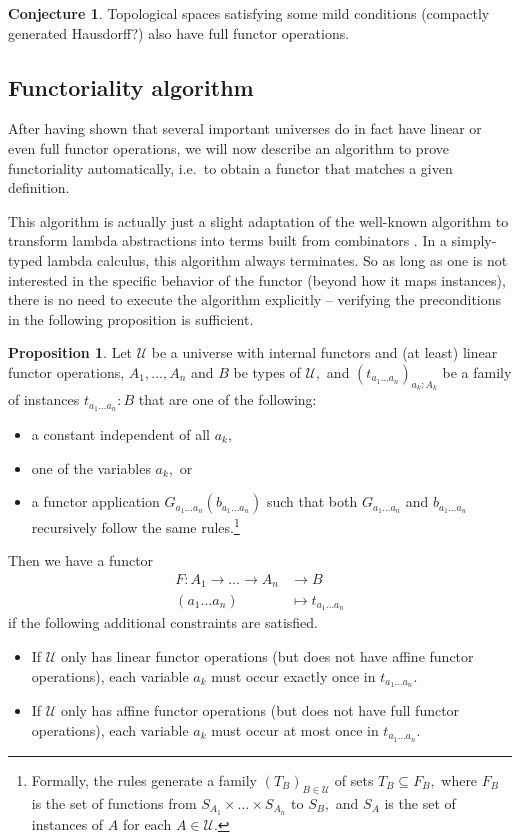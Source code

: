 \documentclass[a4paper]{article}
\theoremstyle{definition}
\newtheorem{proposition}[definition]{Proposition}
\newtheorem{conjecture}[definition]{Conjecture}
\theoremstyle{remark}
\newcommand{\U}{\mathcal{U}}
\begin{document}
\begin{conjecture}
  Topological spaces satisfying some mild conditions (compactly generated Hausdorff?)
  also have full functor operations.
\end{conjecture}

\subsection{Functoriality algorithm}

After having shown that several important universes do in fact have linear or even full
functor operations, we will now describe an algorithm to prove functoriality
automatically, i.e.\ to obtain a functor that matches a given definition.

This algorithm is actually just a slight adaptation of the well-known algorithm to
transform lambda abstractions into terms built from combinators \cite{combinators}. In a
simply-typed lambda calculus, this algorithm always terminates. So as long as one is
not interested in the specific behavior of the functor (beyond how it maps instances),
there is no need to execute the algorithm explicitly -- verifying the preconditions
in the following proposition is sufficient.

\begin{proposition}
  \label{prp:functoriality}
  Let $\U$ be a universe with internal functors and (at least) linear functor
  operations, $A_1,\ldots,A_n$ and $B$ be types of $\U,$ and
  $(t_{a_1 \ldots a_n})_{a_k : A_k}$ be a family of instances $t_{a_1 \ldots a_n} : B$
  that are one of the following:
  \begin{itemize}
    \item a constant independent of all $a_k,$
    \item one of the variables $a_k,$ or
    \item a functor application $G_{a_1 \ldots a_n}(b_{a_1 \ldots a_n})$ such that
    both $G_{a_1 \ldots a_n}$ and $b_{a_1 \ldots a_n}$ recursively follow the same
    rules.\footnote{Formally, the rules generate a family $(T_B)_{B \in \U}$ of
    sets $T_B \subseteq F_B,$ where $F_B$ is the set of functions from
    $S_{A_1} \times \dots \times S_{A_n}$ to $S_B,$ and $S_A$ is the set of
    instances of $A$ for each $A \in \U.$}
  \end{itemize}
  Then we have a functor
  \begin{align*}
    F : A_1 \to \dots \to A_n &\to     B\\
        (a_1 \ldots a_n)      &\mapsto t_{a_1 \ldots a_n}
  \end{align*}
  if the following additional constraints are satisfied.
  \begin{itemize}
    \item If $\U$ only has linear functor operations (but does not have affine
    functor operations), each variable $a_k$ must occur exactly once in $t_{a_1 \ldots a_n}.$
    \item If $\U$ only has affine functor operations (but does not have full
    functor operations), each variable $a_k$ must occur at most once in $t_{a_1 \ldots a_n}.$
  \end{itemize}
\end{proposition}
\end{document}
